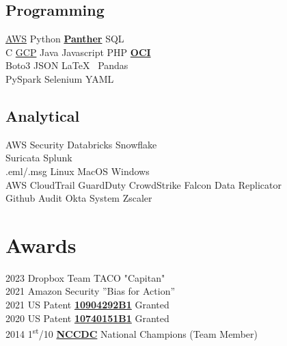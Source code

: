 \documentclass[letterpaper]{deedy-resume} %
\begin{document}
\begin{minipage}[t]{0.33\textwidth}
\subsection{Programming}
\href{https://aws.amazon.com/}{AWS} \textbullet{} Python \textbullet{} \textbf{\href{https://docs.panther.com/}{Panther}} \textbullet{} SQL \\
C \textbullet{} \href{https://console.cloud.google.com/}{GCP} \textbullet{} Java \textbullet{} Javascript \textbullet{} PHP \textbullet{} \textbf{\href{https://www.oracle.com/cloud/}{OCI}} \\
Boto3 \textbullet{} JSON \textbullet{} \LaTeX\ \textbullet{} Pandas \\
PySpark \textbullet{} Selenium \textbullet{} YAML \\

\subsection{Analytical}
AWS Security \textbullet{} Databricks \textbullet {} Snowflake \\
Suricata \textbullet{} Splunk\\
.eml/.msg \textbullet{} Linux \textbullet{} MacOS\textbullet{} Windows \\
AWS CloudTrail \textbullet{} GuardDuty \textbullet{} CrowdStrike Falcon Data Replicator \\
Github Audit \textbullet{} Okta System \textbullet{} Zscaler \\

\sectionspace %



\section{Awards}
2023 Dropbox Team TACO "Capitan" \\
2021 Amazon Security ”Bias for Action” \\
2021 US Patent \textbf{\href{https://patents.google.com/patent/US10904292B1/en}{10904292B1}} Granted \\
2020 US Patent \textbf{\href{https://patents.google.com/patent/US10740151B1/en}{10740151B1}} Granted \\
2014 1\textsuperscript{st}/10 \textbf{\href{https://www.nationalccdc.org/}{NCCDC}} National Champions (Team Member) \\


\end{minipage}
\end{document}
